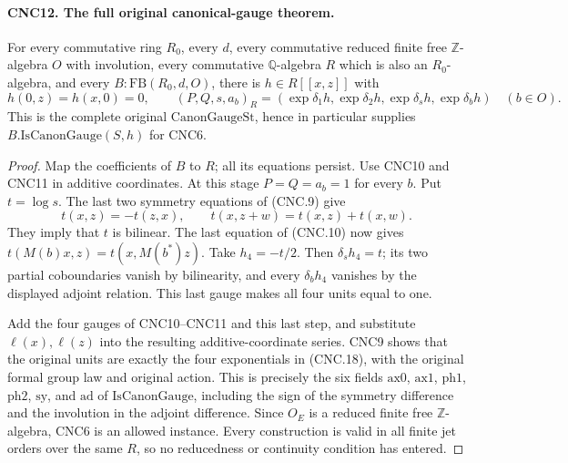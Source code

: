 \paragraph{CNC12. The full original canonical-gauge theorem.}
\label{claim:CNC12}
For every commutative ring \(R_0\), every \(d\), every commutative
reduced finite free \(\mathbb Z\)-algebra \(O\) with involution,
every commutative \(\mathbb Q\)-algebra \(R\) which is also an
\(R_0\)-algebra, and every \(B:\mathrm{FB}(R_0,d,O)\), there is
\(h\in R[[x,z]]\) with
\[
 h(0,z)=h(x,0)=0,\qquad
 (P,Q,s,a_b)_R
   =(\exp\delta_1h,\exp\delta_2h,
      \exp\delta_sh,\exp\delta_bh)\quad(b\in O).              \tag{CNC.18}
\]
This is the complete original \(\mathrm{CanonGaugeSt}\), hence in
particular supplies \(B.\mathrm{IsCanonGauge}(S,h)\) for CNC6.
\begin{proof}
Map the coefficients of \(B\) to \(R\); all its equations persist.
Use CNC10 and CNC11 in additive coordinates.  At this stage
\(P=Q=a_b=1\) for every \(b\).  Put \(t=\log s\).
The last two symmetry equations of (CNC.9) give
\[
 t(x,z)=-t(z,x),\qquad t(x,z+w)=t(x,z)+t(x,w).
\]
They imply that \(t\) is bilinear.  The last equation of (CNC.10)
now gives \(t(M(b)x,z)=t(x,M(b^*)z)\).
Take \(h_4=-t/2\).  Then
\(\delta_sh_4=t\); its two partial coboundaries vanish by
bilinearity, and every \(\delta_bh_4\) vanishes by the displayed
adjoint relation.  This last gauge makes all four units equal to one.

Add the four gauges of CNC10--CNC11 and this last step, and substitute
\(\ell(x),\ell(z)\) into the resulting additive-coordinate
series.  CNC9 shows that the original units are exactly the four
exponentials in (CNC.18), with the original formal group law and
original action.  This is precisely the six fields \(\mathrm{ax0}\),
\(\mathrm{ax1}\), \(\mathrm{ph1}\), \(\mathrm{ph2}\),
\(\mathrm{sy}\), and \(\mathrm{ad}\) of
\(\mathrm{IsCanonGauge}\), including the sign of the symmetry
difference and the involution in the adjoint difference.  Since \(O_E\)
is a reduced finite free \(\mathbb Z\)-algebra, CNC6 is an allowed
instance.  Every construction is valid in all finite jet orders over
the same \(R\), so no reducedness or continuity condition has entered.
\end{proof}

